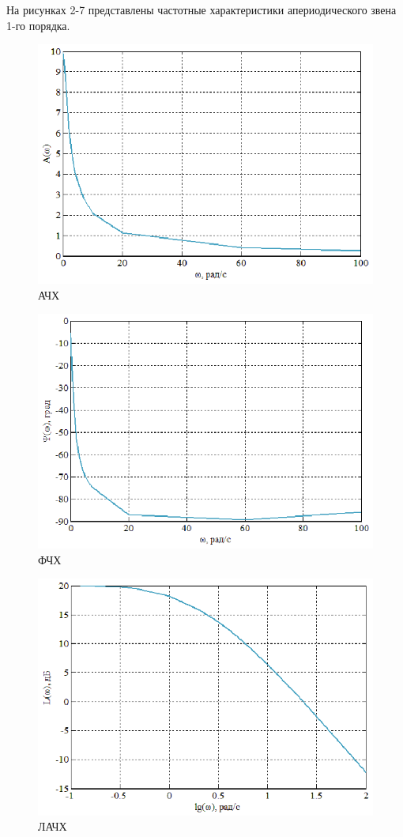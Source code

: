\documentclass[a4paper,12pt]{article} %
\begin{document}
На рисунках 2-7 представлены частотные характеристики апериодического звена 1-го порядка.
\begin{figure}[H]
	\centering
	\includegraphics[width=1\linewidth]{scheme/Ach1.eps}
	\caption{АЧХ}
\end{figure}
\begin{figure}[H]
	\centering
	\includegraphics[width=1\linewidth]{scheme/Fch1.eps}
	\caption{ФЧХ}
\end{figure}
\begin{figure}[H]
	\centering
	\includegraphics[width=1\linewidth]{scheme/Lach1.eps}
	\caption{ЛАЧХ}
\end{figure}
\end{document}
